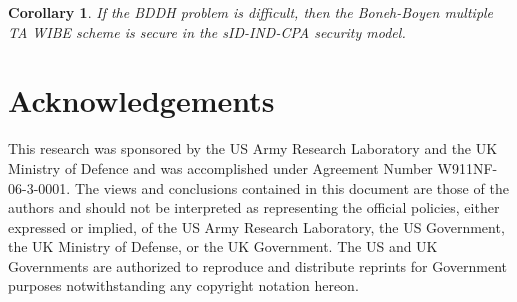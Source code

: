 \documentclass{IEEEtran}
\newtheorem{corollary}[definition]{Corollary}
\begin{document}
\begin{corollary}
If the BDDH problem is difficult, then the Boneh-Boyen multiple TA
WIBE scheme is secure in the sID-IND-CPA security model.
\end{corollary}

\section{Acknowledgements}

This research was sponsored by the US Army Research Laboratory and
the UK Ministry of Defence and was accomplished under Agreement
Number W911NF-06-3-0001. The views and conclusions contained in this
document are those of the authors and should not be interpreted as
representing the official policies, either expressed or implied, of
the US Army Research Laboratory, the US Government, the UK Ministry
of Defense, or the UK Government. The US and UK Governments are
authorized to reproduce and distribute reprints for Government
purposes notwithstanding any copyright notation hereon.



\end{document}
